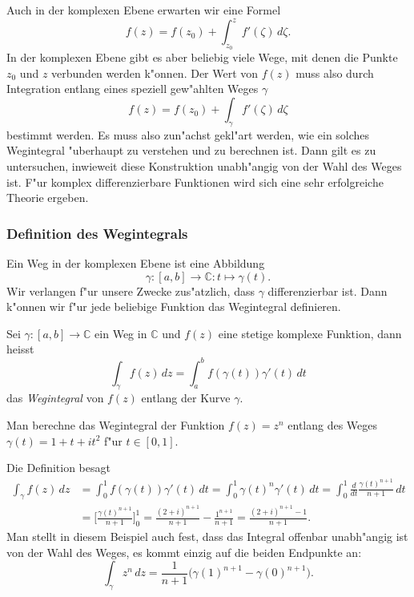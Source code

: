 Auch in der komplexen Ebene erwarten wir eine Formel
\[
f(z) = f(z_0) + \int_{z_0}^z f'(\zeta)\,d\zeta.
\]
In der komplexen Ebene gibt es aber beliebig viele Wege, mit denen die
Punkte $z_0$ und $z$ verbunden werden k"onnen. 
Der Wert von $f(z)$ muss also durch Integration entlang eines speziell
gew"ahlten Weges $\gamma$
\[
f(z) = f(z_0) + \int_{\gamma} f'(\zeta)\,d\zeta
\]
bestimmt werden.
Es muss also zun"achst gekl"art werden, wie ein solches Wegintegral
"uberhaupt zu verstehen und zu berechnen ist.
Dann gilt es zu untersuchen, inwieweit diese Konstruktion unabh"angig
von der Wahl des Weges ist.
F"ur komplex differenzierbare Funktionen wird sich eine sehr erfolgreiche
Theorie ergeben.

%
%
\subsubsection{Definition des Wegintegrals}
Ein Weg in der komplexen Ebene ist eine Abbildung 
%
\[
\gamma\colon [a,b]\to\mathbb C: t\mapsto \gamma(t).
\]
Wir verlangen f"ur unsere Zwecke zus"atzlich, dass $\gamma$ differenzierbar
ist.
Dann k"onnen wir f"ur jede beliebige Funktion das Wegintegral definieren.

\begin{definition}
Sei $\gamma\colon[a,b]\to\mathbb C$ ein Weg in $\mathbb C$ und $f(z)$
eine stetige komplexe Funktion, dann heisst
\[
\int_{\gamma} f(z)\,dz = \int_a^bf(\gamma(t)) \gamma'(t)\,dt
\]
das {\em Wegintegral} von $f(z)$ entlang der Kurve $\gamma$.
\end{definition}

\begin{beispiel}
Man berechne das Wegintegral der Funktion $f(z)=z^n$ entlang des
Weges 
$\gamma(t)=1+t+it^2$
f"ur $t\in[0,1]$.

Die Definition besagt
\begin{align*}
\int_\gamma f(z)\,dz
&=
\int_0^1 f(\gamma(t))\gamma'(t)\,dt
=
\int_0^1 \gamma(t)^n \gamma'(t)\,dt
=
\int_0^1 \frac{d}{dt}\frac{\gamma(t)^{n+1}}{n+1}\,dt
\\
&=
\biggl[\frac{\gamma(t)^{n+1}}{n+1}\biggr]_0^1
=
\frac{(2+i)^{n+1}}{n+1}-\frac{1^{n+1}}{n+1}
=
\frac{(2+i)^{n+1}-1}{n+1}.
\end{align*}
Man stellt in diesem Beispiel auch fest, dass das Integral offenbar
unabh"angig ist von der Wahl des Weges, es kommt einzig auf die
beiden Endpunkte an:
\[
\int_\gamma z^n \,dz = \frac1{n+1}\bigl(\gamma(1)^{n+1}-\gamma(0)^{n+1}\bigr).
\]
\end{beispiel}

